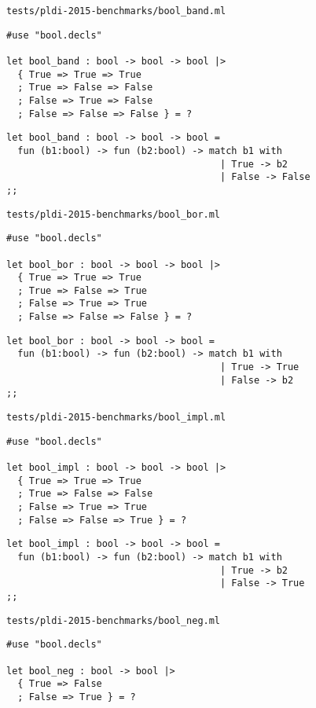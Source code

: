 \noindent\large\texttt{tests/pldi-2015-benchmarks/bool\_band.ml}
\begin{verbatim}
#use "bool.decls"

let bool_band : bool -> bool -> bool |>
  { True => True => True
  ; True => False => False
  ; False => True => False
  ; False => False => False } = ?
\end{verbatim}

\begin{verbatim}
let bool_band : bool -> bool -> bool =
  fun (b1:bool) -> fun (b2:bool) -> match b1 with
                                      | True -> b2
                                      | False -> False
;;
\end{verbatim}

\noindent\large\texttt{tests/pldi-2015-benchmarks/bool\_bor.ml}
\begin{verbatim}
#use "bool.decls"

let bool_bor : bool -> bool -> bool |>
  { True => True => True
  ; True => False => True
  ; False => True => True
  ; False => False => False } = ?
\end{verbatim}

\begin{verbatim}
let bool_bor : bool -> bool -> bool =
  fun (b1:bool) -> fun (b2:bool) -> match b1 with
                                      | True -> True
                                      | False -> b2
;;
\end{verbatim}

\noindent\large\texttt{tests/pldi-2015-benchmarks/bool\_impl.ml}
\begin{verbatim}
#use "bool.decls"

let bool_impl : bool -> bool -> bool |>
  { True => True => True
  ; True => False => False
  ; False => True => True
  ; False => False => True } = ?
\end{verbatim}

\begin{verbatim}
let bool_impl : bool -> bool -> bool =
  fun (b1:bool) -> fun (b2:bool) -> match b1 with
                                      | True -> b2
                                      | False -> True
;;
\end{verbatim}

\noindent\large\texttt{tests/pldi-2015-benchmarks/bool\_neg.ml}
\begin{verbatim}
#use "bool.decls"

let bool_neg : bool -> bool |>
  { True => False
  ; False => True } = ?
\end{verbatim}


